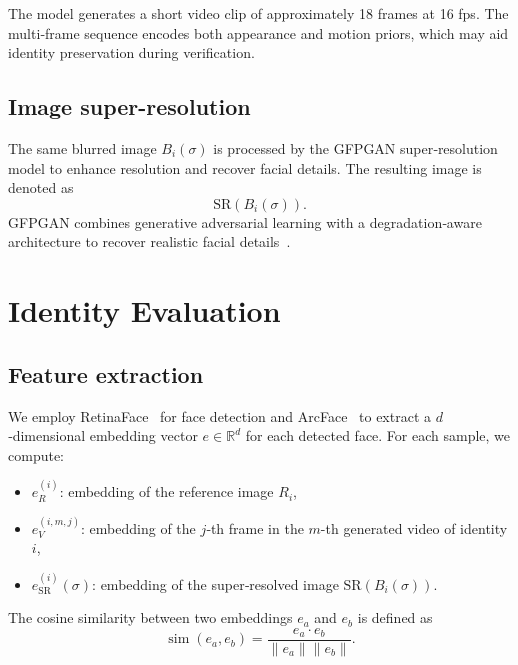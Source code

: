 \documentclass{ieeeaccess}
\begin{document}
The model generates a short video clip of approximately 18 frames at 16 fps. The multi‑frame sequence encodes both appearance and motion priors, which may aid identity preservation during verification.

\subsection{Image super-resolution}
The same blurred image $B_i(\sigma)$ is processed by the GFPGAN super‑resolution model to enhance resolution and recover facial details. The resulting image is denoted as
\begin{equation}
    \text{SR}(B_i(\sigma)).
\end{equation}
GFPGAN combines generative adversarial learning with a degradation‑aware architecture to recover realistic facial details~\cite{GFPGAN}.

\section{Identity Evaluation}
\label{sec:evaluation}

\subsection{Feature extraction}
We employ RetinaFace~\cite{RetinaFace} for face detection and ArcFace~\cite{ArcFace} to extract a $d$‑dimensional embedding vector $e \in \mathbb{R}^d$ for each detected face. For each sample, we compute:

\begin{itemize}
    \item $e_R^{(i)}$: embedding of the reference image $R_i$,
    \item $e_V^{(i,m,j)}$: embedding of the $j$‐th frame in the $m$-th generated video of identity $i$,
    \item $e_{\text{SR}}^{(i)}(\sigma)$: embedding of the super‑resolved image $\text{SR}(B_i(\sigma))$.
\end{itemize}

The cosine similarity between two embeddings $e_a$ and $e_b$ is defined as
\begin{equation}
    \operatorname{sim}(e_a, e_b) = \frac{e_a \cdot e_b}{\|e_a\| \|e_b\|}.
\end{equation}
\end{document}
